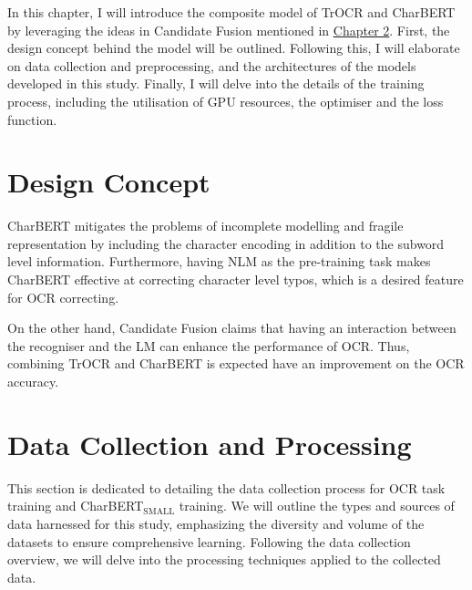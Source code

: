 \label{chap:3_method}
In this chapter, I will introduce the composite model of TrOCR and CharBERT by leveraging the ideas in Candidate Fusion mentioned in \href{chap:2_related_work}{Chapter 2}. First, the design concept behind the model will be outlined. Following this, I will elaborate on data collection and preprocessing, and the architectures of the models developed in this study. Finally, I will delve into the details of the training process, including the utilisation of GPU resources, the optimiser and the loss function.
\section{Design Concept}
\label{sec:3_design_concept}
CharBERT mitigates the problems of incomplete modelling and fragile representation by including the character encoding in addition to the subword level information. Furthermore, having NLM as the pre-training task makes CharBERT effective at correcting character level typos, which is a desired feature for OCR correcting. 

On the other hand, Candidate Fusion claims that having an interaction between the recogniser and the LM can enhance the performance of OCR. Thus, combining TrOCR and CharBERT is expected have an improvement on the OCR accuracy. 
\section{Data Collection and Processing}
\label{sec:3_data_collection_and_processing}
This section is dedicated to detailing the data collection process for OCR task training and CharBERT$_{\text{SMALL}}$ training. We will outline the types and sources of data harnessed for this study, emphasizing the diversity and volume of the datasets to ensure comprehensive learning. Following the data collection overview, we will delve into the processing techniques applied to the collected data.
